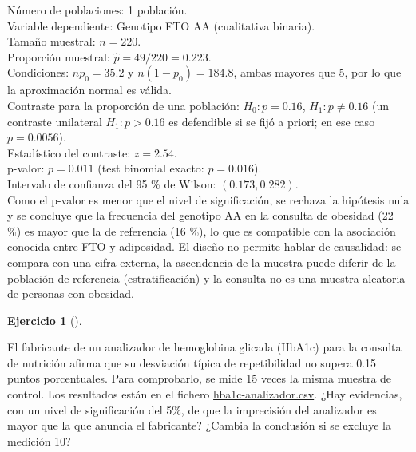 \documentclass[
  spanish,
  a4paper,
]{scrreport}
\theoremstyle{definition}
\newtheorem{exercise}{Ejercicio}[chapter]
\theoremstyle{remark}
\begin{document}
\begin{tcolorbox}[enhanced jigsaw, arc=.35mm, bottomrule=.15mm, bottomtitle=1mm, breakable, colback=white, colbacktitle=quarto-callout-tip-color!10!white, colframe=quarto-callout-tip-color-frame, coltitle=black, left=2mm, leftrule=.75mm, opacityback=0, opacitybacktitle=0.6, rightrule=.15mm, title=\textcolor{quarto-callout-tip-color}{\faLightbulb}\hspace{0.5em}{Solución}, titlerule=0mm, toprule=.15mm, toptitle=1mm]

Número de poblaciones: 1 población.\\
Variable dependiente: Genotipo FTO AA (cualitativa binaria).\\
Tamaño muestral: \(n=220\).\\
Proporción muestral: \(\hat p=49/220=0.223\).\\
Condiciones: \(np_0=35.2\) y \(n(1-p_0)=184.8\), ambas mayores que 5,
por lo que la aproximación normal es válida.\\
Contraste para la proporción de una población: \(H_0:p=0.16\),
\(H_1:p\neq 0.16\) (un contraste unilateral \(H_1:p>0.16\) es defendible
si se fijó a priori; en ese caso \(p=0.0056\)).\\
Estadístico del contraste: \(z=2.54\).\\
p-valor: \(p=0.011\) (test binomial exacto: \(p=0.016\)).\\
Intervalo de confianza del 95 \% de Wilson: \((0.173, 0.282)\).\\
Como el p-valor es menor que el nivel de significación, se rechaza la
hipótesis nula y se concluye que la frecuencia del genotipo AA en la
consulta de obesidad (22 \%) es mayor que la de referencia (16 \%), lo
que es compatible con la asociación conocida entre FTO y adiposidad. El
diseño no permite hablar de causalidad: se compara con una cifra
externa, la ascendencia de la muestra puede diferir de la población de
referencia (estratificación) y la consulta no es una muestra aleatoria
de personas con obesidad.

\end{tcolorbox}

\begin{exercise}[]\protect\hypertarget{exr-contraste-ia-varianza-hba1c}{}\label{exr-contraste-ia-varianza-hba1c}

El fabricante de un analizador de hemoglobina glicada (HbA1c) para la
consulta de nutrición afirma que su desviación típica de repetibilidad
no supera 0.15 puntos porcentuales. Para comprobarlo, se mide 15 veces
la misma muestra de control. Los resultados están en el fichero
\href{datos/hba1c-analizador.csv}{hba1c-analizador.csv}. ¿Hay
evidencias, con un nivel de significación del 5\%, de que la imprecisión
del analizador es mayor que la que anuncia el fabricante? ¿Cambia la
conclusión si se excluye la medición 10?

\end{exercise}
\end{document}
